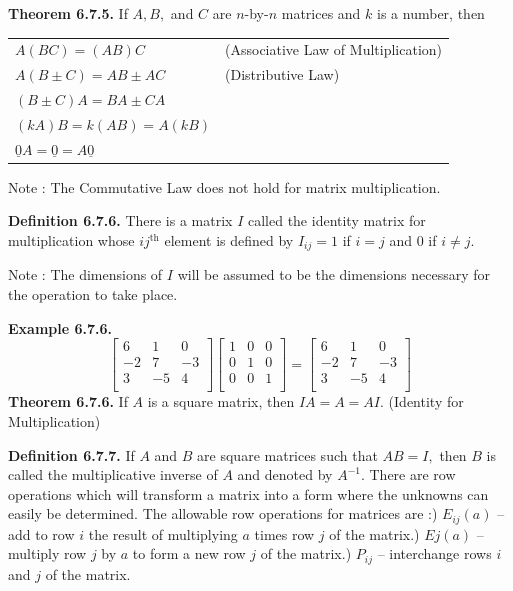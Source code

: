 \textbf{Theorem 6.7.5.}  If $A,B,$ and $C$ are $n$-by-$n$ matrices and $k$ is a number, then \nl
\begin{tabular}{ll}
$A(BC) = (AB)C$&(Associative Law of Multiplication)\\
$A(B\pm C) = AB \pm AC$&(Distributive Law)\\
$(B \pm C)A = BA \pm CA$&\\
$(kA)B = k(AB) = A(kB)$&\\
$\underline{0}A = \underline{0} = A\underline{0}$\\
\end{tabular}\nl

Note : The Commutative Law does not hold for matrix multiplication.\nl

\textbf{Definition 6.7.6.} There is a matrix $I$ called the identity matrix for multiplication whose $ij^{\text{th}}$ element is defined by $I_{ij} = 1$ if $i = j$ and $0$ if $i \neq j.$\nl

Note : The dimensions of $I$ will be assumed to be the dimensions necessary for the operation to take place.\nl

\textbf{Example 6.7.6.}\nl
\begin{equation*}
\left[
\begin{array}{rrr}
6 & 1 & 0\\
-2&7&-3\\
3&-5&4\\
\end{array}
\right]
\left[
\begin{array}{rrr}
1 & 0 & 0\\
0&1&0\\
0&0&1\\
\end{array}
\right]=
\left[
\begin{array}{rrr}
6 & 1 & 0\\
-2&7&-3\\
3&-5&4\\
\end{array}
\right]
\end{equation*}\nl
\textbf{Theorem 6.7.6.} If $A$ is a square matrix, then $IA = A = AI.$  (Identity for Multiplication)\nl

\textbf{Definition 6.7.7.}  If $A$ and $B$ are square matrices such that $AB = I,$ then $B$ is called the multiplicative inverse of $A$ and denoted by $A^{-1}.$\nl
There are row operations which will transform a matrix into a form where the unknowns can easily be determined.\nl
The allowable row operations for matrices are :) $E_{ij}(a)$ -- add to row $i$ the result of multiplying $a$ times row $j$ of the matrix.) $Ej(a)$ -- multiply row $j$ by $a$ to form a new row $j$ of the matrix.) $P_{ij}$ -- interchange rows $i$ and $j$ of the matrix.\nl

